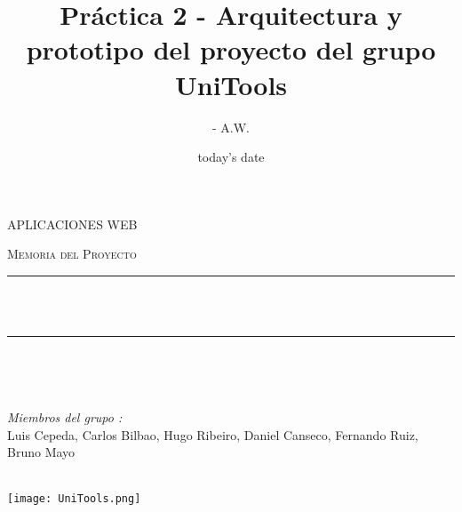 \documentclass[12pt]{report}
\title{Práctica 2 - Arquitectura y prototipo del proyecto del grupo UniTools}
\author{- A.W.}
\date{today's date}
\makeatletter
\let\thetitle\@title
\makeatother
\begin{document}

\begin{titlepage}
	\centering
    \vspace*{0.5 cm}
\begin{center}    \textsc{\Large  APLICACIONES WEB}\\[2.0 cm]	\end{center}%
	\textsc{\Large Memoria del Proyecto }\\[0.5 cm]				%
	\rule{\linewidth}{0.2 mm} \\[0.4 cm]
	{ \huge \bfseries \thetitle}\\
	\rule{\linewidth}{0.2 mm} \\[1.5 cm]
	
	\begin{minipage}{0.4\textwidth}
		\begin{flushleft} \large
			\end{flushleft}
			\end{minipage}~
			\begin{minipage}{0.4\textwidth}
            
			\begin{flushright} \large
			\emph{Miembros del grupo :} \\
			Luis Cepeda, Carlos Bilbao,
			Hugo Ribeiro, Daniel Canseco,
			Fernando Ruiz, Bruno Mayo
			
		\end{flushright}
           
	\end{minipage}\\[2 cm]
	
	\texttt{[image: UniTools.png]}

\end{titlepage}


\tableofcontents
\pagebreak

\renewcommand{\thesection}{\arabic{section}}
\end{document}
